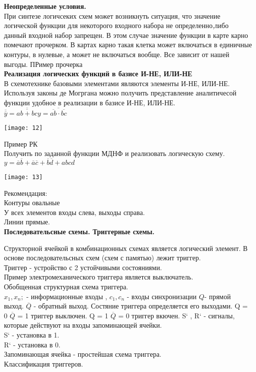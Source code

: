 \Large{ \textbf { Неопределенные условия.}}\\
При синтезе логичсеких схем может возникнуть ситуация, что значение логической функции для некоторого входного набора не определенно,либо данный входной набор запрещен.
В этом случае значение функции в карте карно помечают прочерком.
В картах карно такая клетка может включаться в единичные контуры, в нулевые, а может не включаться вообще.
Все зависит от нашей выгоды.
ПРимер прочерка\\


\Large{ \textbf { Реализация логических функций в базисе И-НЕ, ИЛИ-НЕ}}\\
В схемотехнике базовыми элементами являются элементы И-НЕ, ИЛИ-НЕ.
Используя законы де Могргана можно получить представление аналитичесой функции удобное в реализации в базисе И-НЕ, ИЛИ-НЕ.\\
$
\overline{\overline{y}} = \overline{\overline{ab + bc}}
y = \overline{\overline{ab} \cdot \overline{bc}}
$

\texttt{[image: 12]}

Пример РК\\
Получить по заданной функции МДНФ и реализовать логическую схему.\\
$
y = \overline{a}\overline{b} + \overline{a}\overline{c} +\overline{b} \overline{d} + abcd
$

\texttt{[image: 13]}

Рекомендация: \\
Контуры овальные\\
У всех элементов входы слева, выходы справа.\\
Линии прямые. \\

\Large{ \textbf { Последовательсные схемы.
Триггерные схемы.}}

Структорной ячейкой в комбинационных схемах является логический элемент.
В основе последовательсных схем (схем с памятью) лежит триггер.\\
Триггер - устройство с 2 устойчивыми состояниями.\\
Пример электромеханического триггера является выключатель.\\

Обобщенная структурная схема триггера.\\
$x_1, x_n ;$ - информационные входы , $c_1, c_n$ - входы синхронизации
$Q$- прямой выход. $\overline{Q}$ - обратный выход.
Состяние триггера определяется его выходами.
Q = 0  $\overline{Q}$ = 1 триггер выключен.
Q = 1  $\overline{Q}$ = 0 триггер вкючен.
S` , R`  - сигналы, которые действуют на входы запоминающей ячейки.\\
S` - установка в 1.\\
R` - установка в 0.\\
Запоминающая ячейка - простейшая схема триггера.\\


Классификация триггеров.


